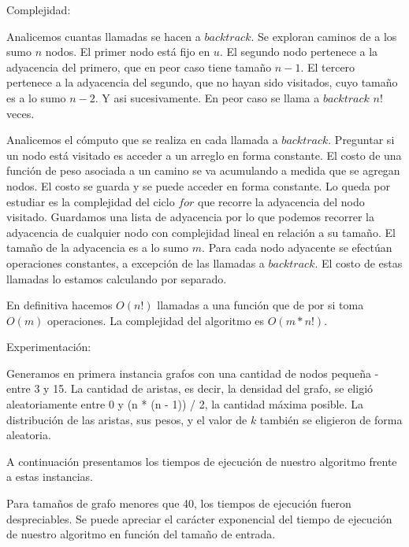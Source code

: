 Complejidad:

Analicemos cuantas llamadas se hacen a $backtrack$. Se exploran caminos de a los sumo $n$ nodos. El primer nodo está fijo en $u$. El segundo nodo
pertenece a la adyacencia del primero, que en peor caso tiene tamaño $n - 1$. El tercero pertenece a la adyacencia del segundo, que no hayan sido
visitados, cuyo tamaño es a lo sumo $n - 2$. Y asi sucesivamente. En peor caso se llama a $backtrack$ $n!$ veces.

Analicemos el cómputo que se realiza en cada llamada a $backtrack$. Preguntar si un nodo está visitado es acceder a un arreglo en forma constante.
El costo de una función de peso asociada a un camino se va acumulando a medida que se agregan nodos. El costo se guarda y se puede acceder en
forma constante. Lo queda por estudiar es la complejidad del ciclo $for$ que recorre la adyacencia del nodo visitado. Guardamos una lista de
adyacencia por lo que podemos recorrer la adyacencia de cualquier nodo con complejidad lineal en relación a su tamaño. El tamaño de la adyacencia
es a lo sumo $m$. Para cada nodo adyacente se efectúan operaciones constantes, a excepción de las llamadas a $backtrack$. El costo de estas
llamadas lo estamos calculando por separado.

En definitiva hacemos $O(n!)$ llamadas a una función que de por si toma $O(m)$ operaciones. La complejidad del algoritmo es $O(m*n!)$.

Experimentación:

Generamos en primera instancia grafos con una cantidad de nodos pequeña - entre 3 y 15. La cantidad de aristas, es decir, la densidad del grafo,
se eligió aleatoriamente entre 0 y (n * (n - 1)) / 2, la cantidad máxima posible. La distribución de las aristas, sus pesos, y el valor de $k$
también se eligieron de forma aleatoria.

A continuación presentamos los tiempos de ejecución de nuestro algoritmo frente a estas instancias. 



Para tamaños de grafo menores que 40, los tiempos de ejecución fueron despreciables. Se puede apreciar el carácter exponencial del tiempo de
ejecución de nuestro algoritmo en función del tamaño de entrada.

